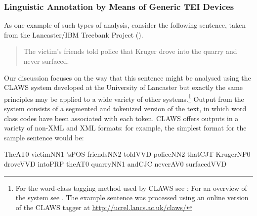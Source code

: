 \subsubsection[{Linguistic Annotation by Means of Generic TEI Devices}]{Linguistic Annotation by Means of Generic TEI Devices}\label{AILAGD}\par
As one example of such types of analysis, consider the following sentence, taken from the Lancaster/IBM Treebank Project (\cite{AI-BIBL-5}). 
\begin{quote}The victim's friends told police that Kruger drove into the quarry and never surfaced.\end{quote}
\par
Our discussion focuses on the way that this sentence might be analysed using the CLAWS system developed at the University of Lancaster but exactly the same principles may be applied to a wide variety of other systems.\footnote{For the word-class tagging method used by CLAWS see \cite{AI-BIBL-6}; For an overview of the system see \cite{AI-BIBL-7}. The example sentence was processed using an online version of the CLAWS tagger at \url{http://ucrel.lancs.ac.uk/claws/}} Output from the system consists of a segmented and tokenized version of the text, in which word class codes have been associated with each token. CLAWS offers outputs in a variety of non-XML and XML formats: for example, the simplest format for the sample sentence would be: \par\hfill\bgroup\exampleFont\vskip 10pt\begin{shaded}
\obeyspaces The\textunderscore AT0 victim\textunderscore NN1 's\textunderscore POS friends\textunderscore NN2 told\textunderscore VVD police\textunderscore NN2 that\textunderscore CJT Kruger\textunderscore NP0 \newline
drove\textunderscore VVD into\textunderscore PRP the\textunderscore AT0 quarry\textunderscore NN1 and\textunderscore CJC never\textunderscore AV0 surfaced\textunderscore VVD\end{shaded}
\par\egroup 
\par
